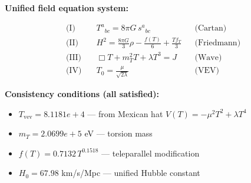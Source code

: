 
\textbf{Unified field equation system:}

\begin{align}
  \text{(I)} \quad & T^a{}_{bc} = 8\pi G \, s^a{}_{bc} && \text{(Cartan)} \\
  \text{(II)} \quad & H^2 = \frac{8\pi G}{3}\rho - \frac{f(T)}{6} + \frac{Tf_T}{3} && \text{(Friedmann)} \\
  \text{(III)} \quad & \Box T + m_T^2 T + \lambda T^3 = J && \text{(Wave)} \\
  \text{(IV)} \quad & T_0 = \frac{\mu}{\sqrt{2\lambda}} && \text{(VEV)}
\end{align}

\textbf{Consistency conditions (all satisfied):}
\begin{itemize}
  \item $T_{\text{vev}} = 8.1181e+4$ — from Mexican hat $V(T) = -\mu^2 T^2 + \lambda T^4$
  \item $m_T = 2.0699e+5$ eV — torsion mass
  \item $f(T) = 0.7132 \, T^{0.1518}$ — teleparallel modification
  \item $H_0 = 67.98$ km/s/Mpc — unified Hubble constant
\end{itemize}
